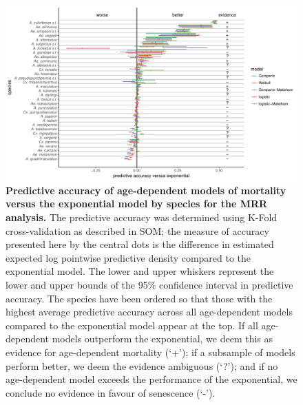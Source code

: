 \documentclass[12pt]{article}
\begin{document}
\begin{figure}[h]
	\centerline{\includegraphics[width=1.3\textwidth]{./Figure_files/mrr_elpd_vs_exponential_ordered.pdf}}
	\caption{\textbf{Predictive accuracy of age-dependent models of mortality versus the exponential model by species for the MRR analysis.} The predictive accuracy was determined using K-Fold cross-validation as described in SOM; the measure of accuracy presented here by the central dots is the difference in estimated expected log pointwise predictive density compared to the exponential model. The lower and upper whiskers represent the lower and upper bounds of the 95\% confidence interval in predictive accuracy. The species have been ordered so that those with the highest average predictive accuracy across all age-dependent models compared to the exponential model appear at the top. If all age-dependent models outperform the exponential, we deem this as evidence for age-dependent mortality (`+'); if a subsample of models perform better, we deem the evidence ambiguous (`?'); and if no age-dependent model exceeds the performance of the exponential, we conclude no evidence in favour of senescence (`-').}
	\label{fig:mrr_elpd}
\end{figure}
\end{document}
